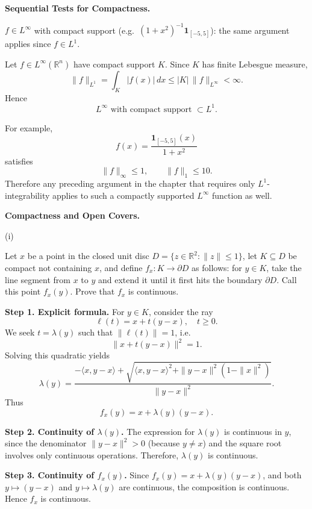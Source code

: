 \begin{problem}[CP-II-0072]
\label{prob:cp-ii-0072}
\textbf{Sequential Tests for Compactness.}

\hspace*{1.5em}$f\in L^\infty$ with compact support (e.g.\ $(1+x^2)^{-1}\mathbf 1_{[-5,5]}$):
	the same argument applies since $f\in L^1$.

\bigskip
\bigskip
\end{problem}

\begin{solution}
Let \(f\in L^\infty(\mathbb R^n)\) have compact support \(K\). Since \(K\) has finite Lebesgue measure,
\[
\|f\|_{L^1}
=
\int_K|f(x)|\,dx
\le
|K|\,\|f\|_{L^\infty}
<
\infty.
\]
Hence
\[
\boxed{
L^\infty\text{ with compact support }\subset L^1.
}
\]

For example,
\[
f(x)=\frac{\mathbf1_{[-5,5]}(x)}{1+x^2}
\]
satisfies
\[
\|f\|_\infty\le1,
\qquad
\|f\|_1
\le10.
\]
Therefore any preceding argument in the chapter that requires only \(L^1\)-integrability applies to such a compactly supported \(L^\infty\) function as well.
\end{solution}


\begin{problem}[CP-II-0073]
\label{prob:cp-ii-0073}
\textbf{Compactness and Open Covers.}

\hspace*{1.5em}(i)

Let $x$ be a point in the closed unit disc $D=\{z\in\mathbb{R}^2 : \|z\|\leq 1\}$, let $K\subseteq D$ be compact not containing $x$, and define $f_x:K\to \partial D$ as follows: for $y\in K$, take the line segment from $x$ to $y$ and extend it until it first hits the boundary $\partial D$. Call this point $f_x(y)$. Prove that $f_x$ is continuous.
\end{problem}

\begin{solution}
\textbf{Step 1. Explicit formula.}
For $y\in K$, consider the ray
\[
\ell(t) = x + t(y-x), \quad t\geq 0.
\]
We seek $t=\lambda(y)$ such that $\|\ell(t)\|=1$, i.e.
\[
\|x + t(y-x)\|^2 = 1.
\]
Solving this quadratic yields
\[
\lambda(y) = \frac{-\langle x, y-x \rangle + \sqrt{\langle x,y-x\rangle^2 + \|y-x\|^2(1-\|x\|^2)}}{\|y-x\|^2}.
\]
Thus
\[
f_x(y) = x + \lambda(y)(y-x).
\]

\medskip

\textbf{Step 2. Continuity of $\lambda(y)$.}
The expression for $\lambda(y)$ is continuous in $y$, since the denominator $\|y-x\|^2>0$ (because $y\neq x$) and the square root involves only continuous operations. Therefore, $\lambda(y)$ is continuous.

\medskip

\textbf{Step 3. Continuity of $f_x(y)$.}
Since $f_x(y) = x + \lambda(y)(y-x)$, and both $y\mapsto (y-x)$ and $y\mapsto \lambda(y)$ are continuous, the composition is continuous. Hence $f_x$ is continuous.

\medskip
\end{solution}

